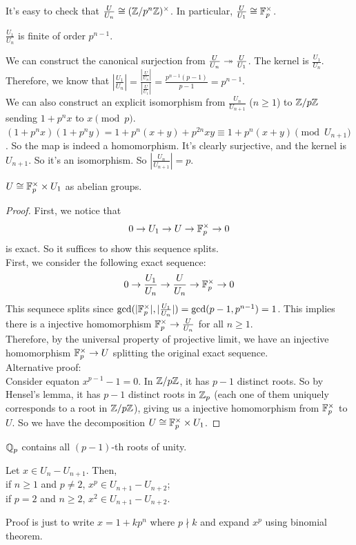 \documentclass[15pt]{scrartcl}
\begin{document}
It's easy to check that $\frac{U}{U_n}\cong (\mathbb Z/p^n\mathbb Z)^{\times}$. In particular, $\frac{U}{U_1}\cong \mathbb F_p^{\times}$. 
\begin{lemma}
    $\frac{U_1}{U_n}$ is finite of order $p^{n-1}$.
\end{lemma}
We can construct the canonical surjection from $\frac{U}{U_n} \twoheadrightarrow \frac{U}{U_1}$. The kernel is $\frac{U_1}{U_n}$. Therefore, we know that $|\frac{U_1}{U_n}|=\frac{|\frac{U}{U_n}|}{|\frac{U}{U_1}|}=\frac{p^{n-1}(p-1)}{p-1}=p^{n-1}$.
\\

We can also construct an explicit isomorphism from $\frac{U_n}{U_{n+1}}$ ($n\geq 1$) to $\mathbb Z/p\mathbb Z$ sending $1+p^nx$ to $x\pmod p$. $(1+p^nx)(1+p^ny)=1+p^n(x+y)+p^{2n}xy\equiv 1+p^n(x+y)\pmod{U_{n+1}}$. So the map is indeed a homomorphism. It's clearly surjective, and the kernel is $U_{n+1}$. So it's an isomorphism. So $|\frac{U_n}{U_{n+1}}|=p$.
\\

\begin{theorem}
    $U\cong \mathbb F_p^{\times} \times U_1$ as abelian groups.
\end{theorem}
\begin{proof}
    First, we notice that 
    \[0\to U_1 \to U \to \mathbb F_p^{\times} \to 0\]
    is exact. So it suffices to show this sequence splits. 
    \\

    First, we consider the following exact sequence:
    \[0 \to \frac{U_1}{U_n}\to \frac{U}{U_n} \to \mathbb F_p^{\times} \to 0\]
    This sequnece splits since $\gcd(|\mathbb F_p^{\times}|,|\frac{U_1}{U_n}|)=\gcd(p-1,p^{n-1})=1$. This implies there is a injective homomorphism $\mathbb F_p^{\times}\to \frac{U}{U_n}$ for all $n \geq 1$. 
    \\

    Therefore, by the universal property of projective limit, we have an injective homomorphism $\mathbb F_p^{\times}\to U$ splitting the original exact sequence.
\\

Alternative proof: 
\\

Consider equaton $x^{p-1}-1=0$. In $\mathbb Z/p\mathbb Z$, it has $p-1$ distinct roots. So by Hensel's lemma, it has $p-1$ distinct roots in $\mathbb Z_p$ (each one of them uniquely corresponds to a root in $\mathbb Z/p\mathbb Z$), giving us a injective homomorphism from $\mathbb F_p^{\times}$ to $U$. So we have the decomposition $U\cong \mathbb F_p^{\times}\times U_1$.
\end{proof}
\begin{corollary}
    $\mathbb Q_p$ contains all $(p-1)$-th roots of unity.
\end{corollary}
\begin{lemma}
    Let $x\in U_n-U_{n+1}$. Then,
    \\
    if $n\geq 1$ and $p\neq 2$, $x^p\in U_{n+1}-U_{n+2}$;
    \\
    if $p=2$ and $n \geq 2$, $x^2\in U_{n+1}-U_{n+2}$. 
\end{lemma}
Proof is just to write $x=1+kp^n$ where $p\nmid k$ and expand $x^p$ using binomial theorem.
\end{document}
